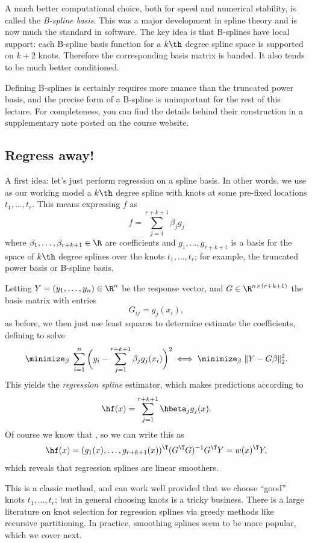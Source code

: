 \documentclass{article}
\begin{document}
A much better computational choice, both for speed and numerical stability, is 
called the \emph{B-spline basis}. This was a major development in spline theory 
and is now much the standard in software. The key idea is that B-splines have
local support: each B-spline basis function for a $k\th$ degree spline space is
supported on $k+2$ knots. Therefore the corresponding basis matrix is banded. It
also tends to be much better conditioned.  

Defining B-splines is certainly requires more nuance than the truncated power
basis, and the precise form of a B-spline is unimportant for the rest of this
lecture. For completeness, you can find the details behind their construction in
a supplementary note posted on the course website.

\subsection{Regress away!}

A first idea: let's just perform regression on a spline basis. In other words,
we use as our working model a $k\th$ degree spline with knots at some pre-fixed 
locations $t_1,\dots,t_r$. This means expressing $f$ as  
\[
f = \sum_{j=1}^{r+k+1} \beta_j g_j
\]
where $\beta_1,\dots,\beta_{r+k+1} \in \R$ are coefficients and
$g_1,\dots,g_{r+k+1}$ is a basis for the space of $k\th$ degree splines over the
knots $t_1,\dots,t_r$; for example, the truncated power basis or B-spline basis.    

Letting $Y=(y_1,\dots,y_n) \in \R^n$ be the response vector, and $G \in \R^{n
  \times (r+k+1)}$ the basis matrix with entries   
\[
G_{ij} = g_j(x_i),
\]
as before, we then just use least squares to determine estimate the
coefficients, defining  to 
solve 
\[
\minimize_\beta \; \sum_{i=1}^n \bigg(y_i -\sum_{j=1}^{r+k+1} \beta_j g_j(x_i) 
\bigg)^2 \iff \minimize_\beta \; \|Y - G\beta\|_2^2.
\]
This yields the \emph{regression spline} estimator, which makes predictions
according to   
\[
\hf(x) = \sum_{j=1}^{r+k+1} \hbeta_j g_j(x).
\]
Of course we know that , so we can write
this as 
\[
\hf(x) = (g_1(x),\dots,g_{r+k+1}(x))^\T (G^\T G)^{-1} G^\T Y = w(x)^\T Y,  
\]
which reveals that regression splines are linear smoothers.

This is a classic method, and can work well provided that we choose ``good''
knots $t_1,\dots,t_r$; but in general choosing knots is a tricky business. There
is a large literature on knot selection for regression splines via greedy
methods like recursive partitioning. In practice, smoothing splines seem to be
more popular, which we cover next.
\end{document}
